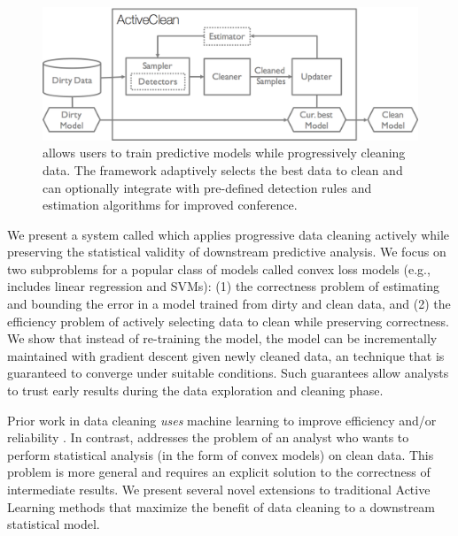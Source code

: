 \begin{figure}[t]
\centering
 \includegraphics[width=\columnwidth]{figs/arch.png}
 \caption{\sysfull allows users to train predictive models while progressively cleaning data. The framework adaptively selects the best data to clean and can optionally integrate with pre-defined detection rules and estimation algorithms for improved conference. \label{sys-arch}}\vspace{-2em}
\end{figure}

We present a system called \sys which applies progressive data cleaning actively while preserving the statistical validity of downstream predictive analysis.
We focus on two subproblems for a popular class of models called convex loss models (e.g., includes linear regression and SVMs): (1) the correctness problem of estimating and bounding the error in a model trained from dirty and clean data, and (2) the efficiency problem of actively selecting data to clean while preserving correctness.
We show that instead of re-training the model, the model can be incrementally maintained with gradient descent given newly cleaned data, an technique that is guaranteed to converge under suitable conditions.
Such guarantees allow analysts to trust early results during the data exploration and cleaning phase.

Prior work in data cleaning \emph{uses} machine learning to improve efficiency and/or reliability \cite{DBLP:journals/pvldb/YakoutENOI11, gokhale2014corleone, yakout2013don, DBLP:journals/pvldb/HaasKWF015}.
In contrast, \sys addresses the problem of an analyst who wants to perform statistical analysis (in the form of convex models) on clean data.
This problem is more general and requires an explicit solution to the correctness of intermediate results.
We present several novel extensions to traditional Active Learning methods that maximize the benefit of data cleaning to a downstream statistical model.






